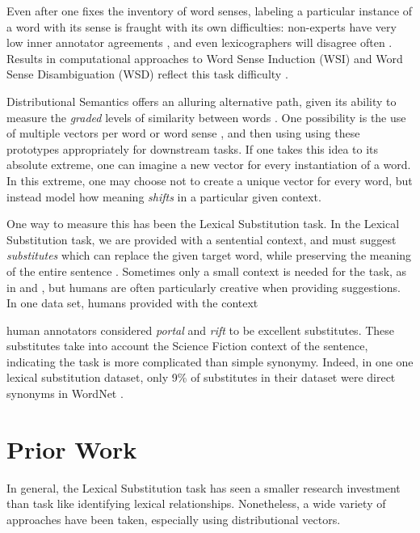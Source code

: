 Even after one fixes the inventory of word senses, labeling a particular
instance of a word with its sense is fraught with its own difficulties:
non-experts have very low inner annotator agreements \cite{yong:1999:siglex},
and even lexicographers will disagree often \cite{kilgarriff:2000:ch}.
Results in computational approaches to Word Sense Induction (WSI) and Word
Sense Disambiguation (WSD) reflect this task difficulty \cite{needcite}.

Distributional Semantics offers an alluring alternative path, given its ability
to measure the {\em graded} levels of similarity between words
\cite{erk:2008:emnlp}.  One possibility is the use of multiple vectors per word
or word sense \cite{reisinger:2010:naacl,huang:2012:acl}, and then using using
these prototypes appropriately for downstream tasks. If one takes this idea to
its absolute extreme, one can imagine a new vector for every instantiation of a
word. In this extreme, one may choose not to create a unique vector for every
word, but instead model how meaning {\em shifts} in a particular given context.

One way to measure this has been the Lexical Substitution task. In
the Lexical Substitution task, we are provided with a sentential context, and
must suggest {\em substitutes} which can replace the given target word, while
preserving the meaning of the entire sentence
\cite{mccarthy:2007:semeval,biemann:2012:lrec,kremer:2014:eacl}.
Sometimes only a small context is needed for the task, as in 
and , but humans are often particularly creative when
providing suggestions. In one data set, humans provided with the context
\begin{quote}
\end{quote}
human annotators considered {\em portal} and {\em rift} to be excellent
substitutes. These substitutes take into account the Science Fiction context of
the sentence, indicating the task is more complicated than simple synonymy.
Indeed, in one one lexical substitution dataset, only 9\% of substitutes in
their dataset were direct synonyms in WordNet \cite{kremer:2014:eacl}.

\section{Prior Work}

In general, the Lexical Substitution task has seen a smaller research
investment than task like identifying lexical relationships. Nonetheless, a
wide variety of approaches have been taken, especially using distributional
vectors.

